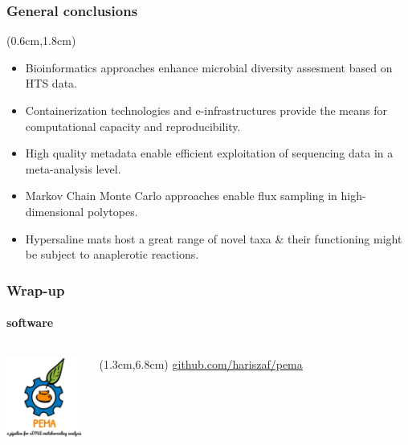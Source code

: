 \documentclass{beamer}
\begin{document}
   \begin{darkframes}

   \begin{frame}
      \frametitle{\textbf{General conclusions}}
      \begin{singlespace}
      \begin{textblock*}{11cm}(0.6cm,1.8cm)
      \small 
      \begin{itemize}
      
         \item Bioinformatics approaches enhance microbial diversity assesment based on HTS data.
         \bigskip
         \item Containerization technologies and e-infrastructures provide the means for computational capacity and reproducibility.
         \bigskip
         \item High quality metadata enable efficient exploitation of sequencing data in a meta-analysis level.
         \bigskip
         \item Markov Chain Monte Carlo approaches enable flux sampling in high-dimensional polytopes.
         \bigskip
         \item Hypersaline mats host a great range of novel taxa \& their functioning might be subject to anaplerotic reactions.
      \end{itemize}
      \end{textblock*}
   \end{singlespace}
   \end{frame}
   \fi 


   \begin{frame}
      \frametitle{Wrap-up}
      \framesubtitle{software}

      \begin{columns}[onlytextwidth]


            \includegraphics[width=25mm]{resources/pema_logo.png}

            \begin{textblock*}{3cm}(1.3cm,6.8cm)
               \tiny \href{https://github.com/hariszaf/pema}{github.com/hariszaf/pema}
            \end{textblock*}


\end{columns}
\end{frame}
\end{darkframes}
\end{document}
